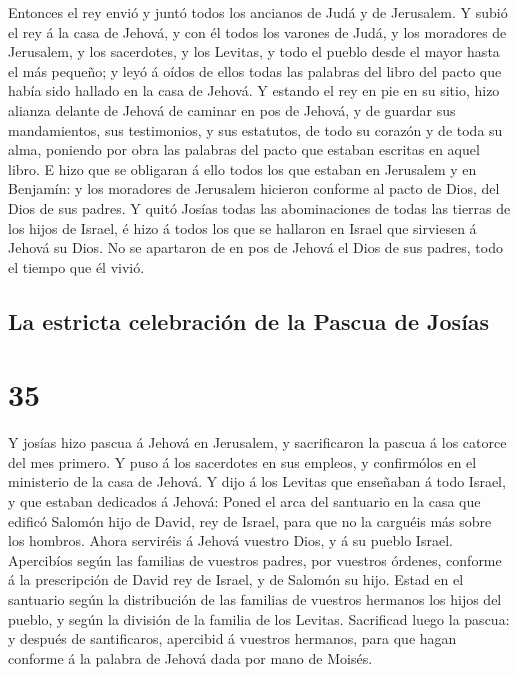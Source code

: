  Entonces el rey envió y juntó todos los ancianos de Judá y
de Jerusalem.  Y subió el rey á la casa de Jehová, y con él
todos los varones de Judá, y los moradores de Jerusalem, y los
sacerdotes, y los Levitas, y todo el pueblo desde el mayor hasta el más
pequeño; y leyó á oídos de ellos todas las palabras del libro del pacto
que había sido hallado en la casa de Jehová.  Y estando el
rey en pie en su sitio, hizo alianza delante de Jehová de caminar en pos
de Jehová, y de guardar sus mandamientos, sus testimonios, y sus
estatutos, de todo su corazón y de toda su alma, poniendo por obra las
palabras del pacto que estaban escritas en aquel libro.  E
hizo que se obligaran á ello todos los que estaban en Jerusalem y en
Benjamín: y los moradores de Jerusalem hicieron conforme al pacto de
Dios, del Dios de sus padres.  Y quitó Josías todas las
abominaciones de todas las tierras de los hijos de Israel, é hizo á
todos los que se hallaron en Israel que sirviesen á Jehová su Dios. No
se apartaron de en pos de Jehová el Dios de sus padres, todo el tiempo
que él vivió.

\hypertarget{la-estricta-celebraciuxf3n-de-la-pascua-de-josuxedas}{%
\subsection{La estricta celebración de la Pascua de
Josías}\label{la-estricta-celebraciuxf3n-de-la-pascua-de-josuxedas}}

\hypertarget{section-34}{%
\section{35}\label{section-34}}

 Y josías hizo pascua á Jehová en Jerusalem, y sacrificaron
la pascua á los catorce del mes primero.  Y puso á los
sacerdotes en sus empleos, y confirmólos en el ministerio de la casa de
Jehová.  Y dijo á los Levitas que enseñaban á todo Israel, y
que estaban dedicados á Jehová: Poned el arca del santuario en la casa
que edificó Salomón hijo de David, rey de Israel, para que no la
carguéis más sobre los hombros. Ahora serviréis á Jehová vuestro Dios, y
á su pueblo Israel.  Apercibíos según las familias de
vuestros padres, por vuestros órdenes, conforme á la prescripción de
David rey de Israel, y de Salomón su hijo.  Estad en el
santuario según la distribución de las familias de vuestros hermanos los
hijos del pueblo, y según la división de la familia de los Levitas.
 Sacrificad luego la pascua: y después de santificaros,
apercibid á vuestros hermanos, para que hagan conforme á la palabra de
Jehová dada por mano de Moisés.

